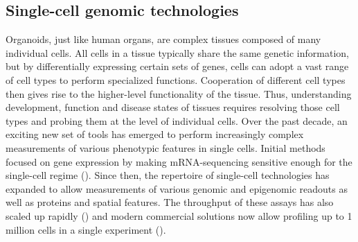 \subsection{Single-cell genomic technologies}



Organoids, just like human organs, are complex tissues composed of many individual cells. All cells in a tissue typically share the same genetic information, but by differentially expressing certain sets of genes, cells can adopt a vast range of cell types to perform specialized functions. Cooperation of different cell types then gives rise to the higher-level functionality of the tissue. Thus, understanding development, function and disease states of tissues requires resolving those cell types and probing them at the level of individual cells. Over the past decade, an exciting new set of tools has emerged to perform increasingly complex measurements of various phenotypic features in single cells. Initial methods focused on gene expression by making mRNA-sequencing sensitive enough for the single-cell regime (\cite{tang_mrna-seq_2009}). Since then, the repertoire of single-cell technologies has expanded to allow measurements of various genomic and epigenomic readouts as well as proteins and spatial features. The throughput of these assays has also scaled up rapidly (\cite{svensson_exponential_2018}) and modern commercial solutions now allow profiling up to 1 million cells in a single experiment (\cite{srivatsan_massively_2020,mulqueen_high-content_2021}). 

